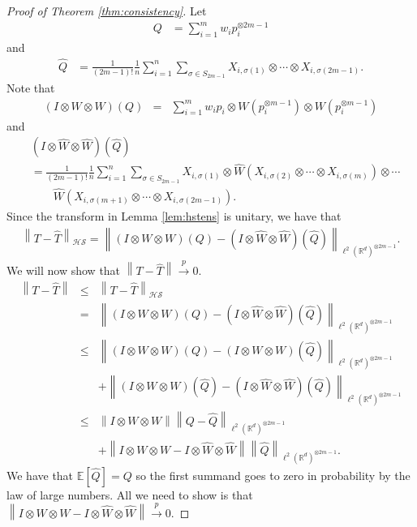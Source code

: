 \documentclass[aos,preprint]{imsart}
\def\rn{\mathbb{R}}
\def\l{\left}
\def\r{\right}
\def\hs{\mathscr{HS}}
\def\cip{\overset{p}{\rightarrow}}
\def\lrd{{\ell^2\left( \rn^d \right)}}
\theoremstyle{plain}
\theoremstyle{defintion}
\begin{document}
	\begin{proof}[Proof of Theorem \ref{thm:consistency}]
	Let 
	\begin{align*}
		Q &=  \sum_{i=1}^m w_i p_i^{\otimes 2m-1}
	\end{align*}
	and
	\begin{align*}
		\widehat{Q} &=   \frac{1}{\left( 2m-1 \right)!} \frac{1}{n} \sum_{i=1}^n \sum_{\sigma \in S_{2m-1}} X_{i,\sigma\left( 1 \right)} \otimes \cdots \otimes X_{i,\sigma\left( 2m-1 \right)}.
	\end{align*}
	Note that 
	\begin{eqnarray*}
		\left( I\otimes W \otimes W \right)\left( Q \right) &=&  \sum_{i=1}^m w_i p_i \otimes W\left( p_i^{\otimes m-1}  \right) \otimes W\left( p_i^{\otimes m-1} \right)
	\end{eqnarray*}
	and
	\begin{align*}
		&\left( I\otimes \widehat{W}\otimes \widehat{W} \right)(\widehat{Q})  \\
		&= \frac{1}{\left( 2m-1 \right)!} \frac{1}{n} \sum_{i=1}^n \sum_{\sigma \in S_{2m-1}} X_{i,\sigma\left( 1 \right)} \otimes \widehat{W} \left( X_{i,\sigma\left( 2 \right)} \otimes \cdots \otimes X_{i,\sigma\left( m \right)} \right) \otimes \cdots \\
		&\qquad \widehat{W}  \l(X_{i,\sigma\left( m+1 \right)} \otimes \cdots \otimes X_{i,\sigma\left( 2m-1 \right)}\r).
	\end{align*}
	Since the transform in Lemma \ref{lem:hstens} is unitary, we have that 
	\begin{eqnarray*}
            \l\|T - \widehat{T} \r\|_\hs = \l\|\left( I\otimes W\otimes W \right) (Q)  - \left( I\otimes \widehat{W}\otimes \widehat{W} \right)\left( \widehat{Q} \right)\r\|_{\lrd^{\otimes 2m-1}}.
	\end{eqnarray*}
	We will now show that $\l\|T - \widehat{T}\r\| \cip 0$. 
	\begin{eqnarray*}
		\l\|T - \widehat{T} \r\| 
		&\le& \l\|T - \widehat{T} \r\|_{\hs} \\
                &=& \l\|(I \otimes W \otimes W)(Q) - \left( I \otimes \widehat{W} \otimes \widehat{W}\right) \left( \widehat{Q} \right) \r\|_{\lrd^{\otimes 2m-1}}\\
                &\le& \l\|(I \otimes W \otimes W)(Q) -  (I \otimes W \otimes W)(\widehat{Q})\r\|_{\lrd^{\otimes 2m-1}}  \\
                && +\l\|  (I \otimes W \otimes W)(\widehat{Q}) - \left( I \otimes \widehat{W} \otimes \widehat{W}\right) \left( \widehat{Q} \right) \r\|_{\lrd^{\otimes 2m-1}}\\
                &\le& \l\|I \otimes W \otimes W\r\| \l\|Q - \widehat{Q}\r\|_{\lrd^{\otimes 2m-1}}  \\
                && +\l\|  I \otimes W \otimes W -  I \otimes \widehat{W} \otimes \widehat{W}  \r\| \l\|\widehat{Q}\r\|_{\lrd^{\otimes 2m-1}}.
	\end{eqnarray*}
	We have that $\mathbb{E} \left[ \widehat{Q} \right] = Q$ so the first summand goes to zero in probability by the law of large numbers. All we need to show is that $\l\|  I \otimes W \otimes W -  I \otimes \widehat{W} \otimes \widehat{W}  \r\| \cip 0$.


\end{proof}
\end{document}

